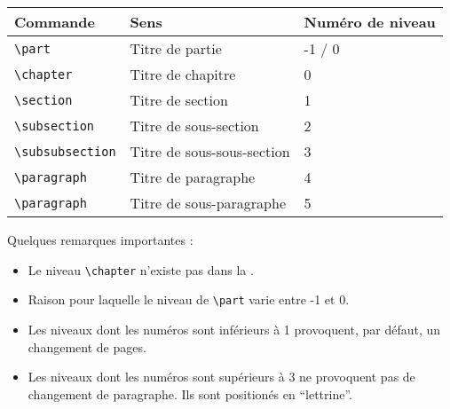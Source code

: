  	\begin{tabular}{|l||l|l|}
	\hline 	
 	Commande 				& Sens 						& Numéro de niveau 	\\
 	\hline
 	\hline
 	\verb|\part| 			& Titre de partie 			& -1 / 0	 \\
 	\verb|\chapter| 		& Titre de chapitre 		& 0 	 	 \\
	\verb|\section|			& Titre de section  		& 1			\\
	\verb|\subsection|		& Titre de sous-section 	& 2			\\
	\verb|\subsubsection|	& Titre de sous-sous-section& 3			\\
	\verb|\paragraph|		& Titre de paragraphe 		&4			\\
	\verb|\paragraph|		& Titre de sous-paragraphe 	&5			\\
	\hline
	\end{tabular}


Quelques remarques importantes :
\begin{itemize}
\item Le niveau \verb|\chapter| n'existe pas dans la  .
\item Raison pour laquelle le niveau de \verb|\part| varie entre -1 et 0.
\item Les niveaux dont les numéros sont inférieurs à 1 provoquent, par défaut, un changement de pages.
\item Les niveaux dont les numéros sont supérieurs à 3 ne provoquent pas de changement de paragraphe. Ils sont positionés en \enquote{lettrine}.
\end{itemize}

